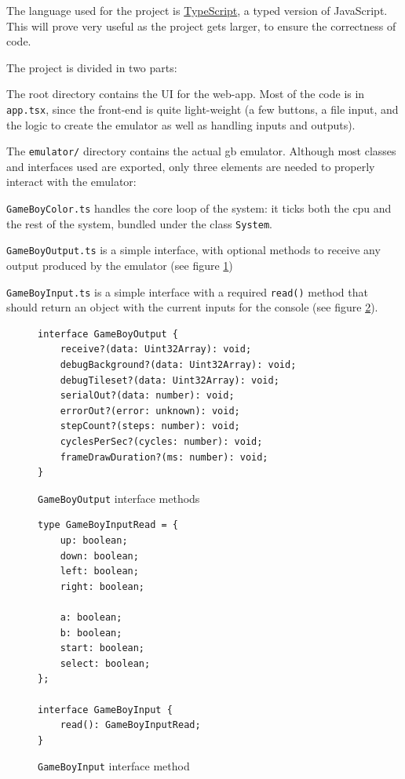 \documentclass[11pt]{report}
\begin{document}
The language used for the project is \href{https://www.typescriptlang.org/}{TypeScript}, a typed version of JavaScript. This will prove very useful as the project gets larger, to ensure the correctness of code.

The project is divided in two parts:
\begin{compactitem}
    \item The root directory contains the UI for the web-app. Most of the code is in \texttt{app.tsx}, since the front-end is quite light-weight (a few buttons, a file input, and the logic to create the emulator as well as handling inputs and outputs).
    \item  The \texttt{emulator/} directory contains the actual \gls{gb} emulator. Although most classes and interfaces used are exported, only three elements are needed to properly interact with the emulator:
    \begin{compactitem}
        \item \texttt{GameBoyColor.ts} handles the core loop of the system: it ticks both the \gls{cpu} and the rest of the system, bundled under the class \texttt{System}.
        \item \texttt{GameBoyOutput.ts} is a simple interface, with optional methods to receive any output produced by the emulator (see figure \ref{fig:gameboyoutput})
        \item \texttt{GameBoyInput.ts} is a simple interface with a required \texttt{read()} method that should return an object with the current inputs for the console (see figure \ref{fig:gameboyinput}).
    \end{compactitem}
\end{compactitem}

\begin{figure}[h]
    \begin{verbatim}
interface GameBoyOutput {
    receive?(data: Uint32Array): void;
    debugBackground?(data: Uint32Array): void;
    debugTileset?(data: Uint32Array): void;
    serialOut?(data: number): void;
    errorOut?(error: unknown): void;
    stepCount?(steps: number): void;
    cyclesPerSec?(cycles: number): void;
    frameDrawDuration?(ms: number): void;
}
    \end{verbatim}
    \caption{\texttt{GameBoyOutput} interface methods}
    \label{fig:gameboyoutput}
\end{figure}

\begin{figure}[h]
    \begin{verbatim}
type GameBoyInputRead = {
    up: boolean;
    down: boolean;
    left: boolean;
    right: boolean;

    a: boolean;
    b: boolean;
    start: boolean;
    select: boolean;
};

interface GameBoyInput {
    read(): GameBoyInputRead;
}
    \end{verbatim}
    \caption{\texttt{GameBoyInput} interface method}
    \label{fig:gameboyinput}
\end{figure}
\end{document}
